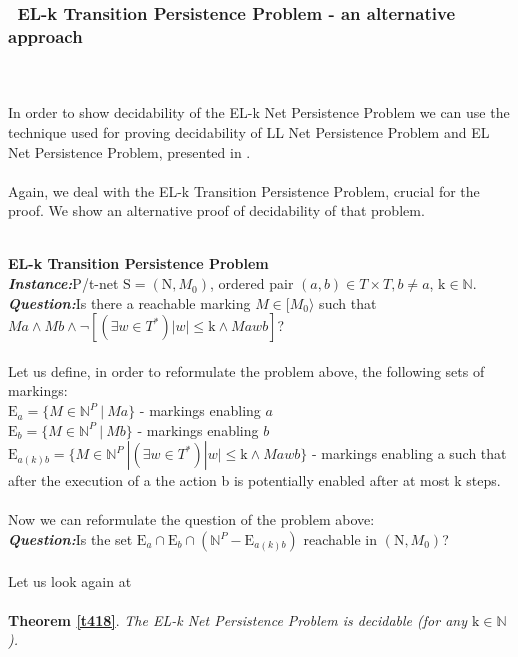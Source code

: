 \documentclass[a4paper]{llncs}
\begin{document}
\subsubsection{\textbullet \ EL-k Transition Persistence Problem - an alternative approach}\mbox{ }\\
\\
In order to show decidability of the EL-k Net Persistence Problem we can use the technique used for proving decidability of LL Net Persistence Problem and EL Net Persistence Problem, presented in \cite{BarOch}.
\\ \\
Again, we deal with the EL-k Transition Persistence Problem, crucial for the proof. We show an alternative proof of decidability of that problem.


\mbox{ }\\
\textbf{EL-k Transition Persistence Problem}
\\
\indent\textbf{\emph{Instance:}}P/t-net $\mathrm{S}=(\mathrm{N}, M_0)$, ordered pair $(a,b)\in T\times T, b\neq a$, $\mathrm{k}\in\mathbb{N}$.\\
\indent\textbf{\emph{Question:}}Is there a reachable marking $M \in [M_0\rangle$ such that  \\
\indent\indent \indent\indent$Ma \land Mb \land \lnot[(\exists w\in T^*) |w|\leq \mathrm{k} \land Mawb]$?
\\
\\
Let us define, in order to reformulate the problem above, the following sets of markings:\\
$\mathrm{E}_a = \{M\in \mathbb{N}^{P} \ | \ Ma\}$ - markings enabling $a$ \\
$\mathrm{E}_b = \{M\in \mathbb{N}^{P} \ | \ Mb\}$ - markings enabling $b$ \\
$\mathrm{E}_{a(k)b} = \{M\in \mathbb{N}^{P} \ | (\exists w\in T^*) |w|\leq\mathrm{k} \land Mawb\}$ - markings enabling a such that after the execution of a the action b is potentially enabled after at most k steps.
\\
\\
Now we can reformulate the question of the  problem above:
\\
\indent\textbf{\emph{Question:}}Is the set
$\mathrm{E}_a\cap \mathrm{E}_b \cap (\mathbb{N}^{P}-\mathrm{E}_{a(k)b})$ reachable in $(\mathrm{N}, M_0)$?
\\
\\
Let us look again at\\ \\
\textbf{Theorem \ref{t418}}. 
\textit{The EL-k Net Persistence Problem is decidable (for any $\mathrm{k}\in \mathbb{N}$).}
\end{document}

